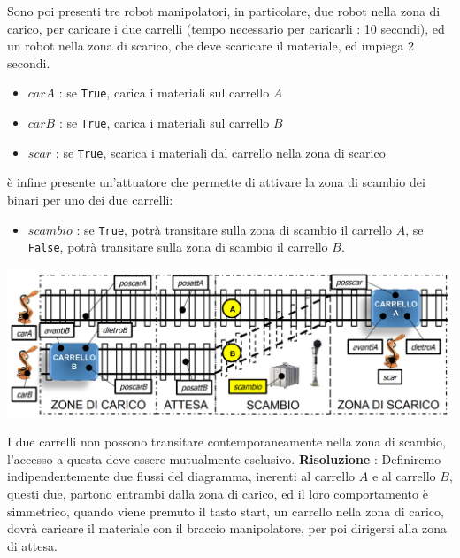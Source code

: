 \documentclass[10pt, letterpaper]{report}
\begin{document}
Sono poi presenti tre robot manipolatori, in particolare, due robot nella zona di carico, per caricare i due carrelli (tempo necessario per caricarli : 10 secondi), ed un robot nella zona di scarico, che deve scaricare il materiale, ed impiega 2 secondi.\begin{itemize}
    \item \color{gray}$carA$\color{black} : se \texttt{True}, carica i materiali sul carrello $A$ 
    \item \color{gray}$carB$\color{black} : se \texttt{True}, carica i materiali sul carrello $B$ 
    \item \color{gray}$scar$\color{black} : se \texttt{True}, scarica i materiali dal carrello nella zona di scarico
\end{itemize}
è infine presente un'attuatore che permette di attivare la zona di scambio dei binari per uno dei due carrelli:\begin{itemize}
    \item \color{gray}$scambio$\color{black} : se \texttt{True}, potrà transitare sulla zona di scambio il carrello $A$, se \texttt{False}, potrà transitare sulla zona di scambio il carrello $B$.
\end{itemize}
\begin{center}
    \includegraphics[width=1\textwidth ]{images/carrelli2.png}
\end{center}
I due carrelli non possono transitare contemporaneamente nella zona di scambio, l'accesso a questa deve essere mutualmente esclusivo. \acc 
\textbf{Risoluzione} : Definiremo indipendentemente due flussi del diagramma, inerenti al carrello $A$ e al carrello $B$, questi due, partono entrambi dalla zona di carico, ed il loro comportamento è simmetrico, quando viene premuto il tasto start, un carrello nella zona di carico, dovrà caricare il materiale con il braccio manipolatore, per poi dirigersi alla zona di attesa.
\end{document}
